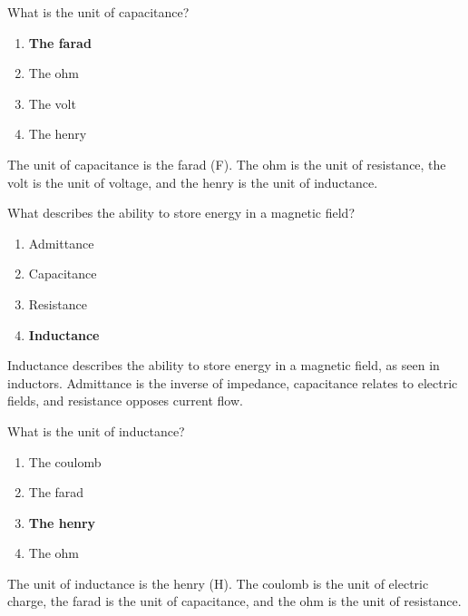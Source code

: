 
\begin{tcolorbox}[colback=gray!10!white,colframe=black!75!black,title={T5C02}]
    What is the unit of capacitance?
    \begin{enumerate}[label=\Alph*,noitemsep]
        \item \textbf{The farad}
        \item The ohm
        \item The volt
        \item The henry
    \end{enumerate}
\end{tcolorbox}
The unit of capacitance is the farad (F). The ohm is the unit of resistance, the volt is the unit of voltage, and the henry is the unit of inductance.


\begin{tcolorbox}[colback=gray!10!white,colframe=black!75!black,title={T5C03}]
    What describes the ability to store energy in a magnetic field?
    \begin{enumerate}[label=\Alph*,noitemsep]
        \item Admittance
        \item Capacitance
        \item Resistance
        \item \textbf{Inductance}
    \end{enumerate}
\end{tcolorbox}
Inductance describes the ability to store energy in a magnetic field, as seen in inductors. Admittance is the inverse of impedance, capacitance relates to electric fields, and resistance opposes current flow.


\begin{tcolorbox}[colback=gray!10!white,colframe=black!75!black,title={T5C04}]
    What is the unit of inductance?
    \begin{enumerate}[label=\Alph*,noitemsep]
        \item The coulomb
        \item The farad
        \item \textbf{The henry}
        \item The ohm
    \end{enumerate}
\end{tcolorbox}
The unit of inductance is the henry (H). The coulomb is the unit of electric charge, the farad is the unit of capacitance, and the ohm is the unit of resistance.

